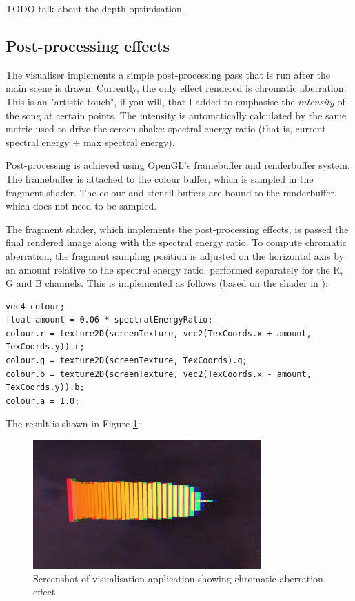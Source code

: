 \documentclass[11pt]{article}
\begin{document}
TODO talk about the depth optimisation.

\subsection{Post-processing effects}
The visualiser implements a simple post-processing pass that is run after the main scene is drawn. Currently,
the only effect rendered is chromatic aberration. This is an "artistic touch", if you will, that I added to
emphasise the \textit{intensity} of the song at certain points. The intensity is automatically calculated by
the same metric used to drive the screen shake: spectral energy ratio (that is, current spectral energy $\div$
max spectral energy).

Post-processing is achieved using OpenGL's framebuffer and renderbuffer system. The framebuffer is attached to
the colour buffer, which is sampled in the fragment shader. The colour and stencil buffers are bound to the
renderbuffer, which does not need to be sampled.

The fragment shader, which implements the post-processing effects, is passed the final rendered image along
with the spectral energy ratio. To compute chromatic aberration, the fragment sampling position is adjusted on
the horizontal axis by an amount relative to the spectral energy ratio, performed separately for the R, G and
B channels. This is implemented as follows (based on the shader in \cite{godotChromatic}):

\begin{verbatim}
vec4 colour;
float amount = 0.06 * spectralEnergyRatio;
colour.r = texture2D(screenTexture, vec2(TexCoords.x + amount, TexCoords.y)).r;
colour.g = texture2D(screenTexture, TexCoords).g;
colour.b = texture2D(screenTexture, vec2(TexCoords.x - amount, TexCoords.y)).b;
colour.a = 1.0;
\end{verbatim}

The result is shown in Figure \ref{fig:chromatic}:

\begin{figure}[H]
\centering
\includegraphics[width=330px]{img/chromatic_small.png}
\caption{Screenshot of visualisation application showing chromatic aberration effect}
\label{fig:chromatic}
\end{figure}
\end{document}
